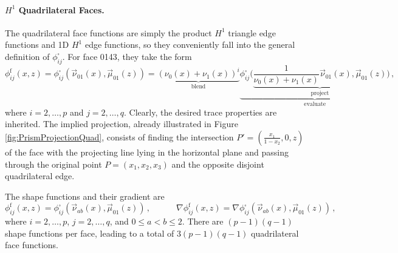 \paragraph{\texorpdfstring{$H^1$}{H1} Quadrilateral Faces.} 
The quadrilateral face functions are simply the product $H^1$ triangle edge functions and 1D $H^1$ edge functions, so they conveniently fall into the general definition of $\phi_{ij}^\square$.
For face 0143, they take the form
\begin{equation*}
	\phi_{ij}^\mathrm{f}(x,z)=\phi_{ij}^\square(\vec{\nu}_{01}(x),\vec{\mu}_{01}(z))
		=\underbrace{(\nu_0(x)+\nu_1(x))^i}_{\text{blend}}
			\underbrace{\phi_{ij}^\square\Big(\underbrace{\textstyle{\frac{1}{\nu_0(x)+\nu_1(x)}}
				\vec{\nu}_{01}(x),\vec{\mu}_{01}(z)}_{\text{project}}\Big)}_{\text{evaluate}}\,,
\end{equation*}
where $i=2,\ldots,p$ and $j=2,\ldots,q$.
Clearly, the desired trace properties are inherited.
The implied projection, already illustrated in Figure \ref{fig:PrismProjectionQuad}, consists of finding the intersection $P'=(\frac{x_1}{1-x_2},0,z)$ of the face with the projecting line lying in the horizontal plane and passing through the original point $P=(x_1,x_2,x_3)$ and the opposite disjoint quadrilateral edge. 

The shape functions and their gradient are
\begin{equation}
		\phi_{ij}^\mathrm{f}(x,z)=\phi_{ij}^\square(\vec{\nu}_{ab}(x),\vec{\mu}_{01}(z))\,,\qquad\quad
		\nabla\phi_{ij}^\mathrm{f}(x,z)=\nabla\phi_{ij}^\square(\vec{\nu}_{ab}(x),\vec{\mu}_{01}(z))\,,
\end{equation}
where $i=2,\ldots,p$, $j=2,\ldots,q$, and $0\leq a<b\leq2$. 
There are $(p-1)(q-1)$ shape functions per face, leading to a total of $3(p-1)(q-1)$ quadrilateral face functions.

